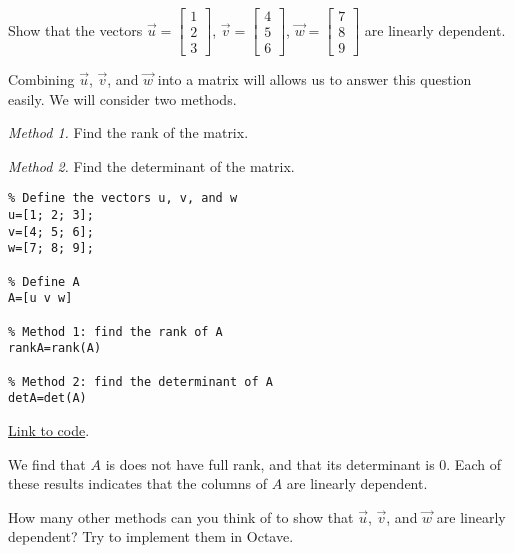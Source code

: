 \documentclass{ximera}
\begin{document}
\begin{example}
    Show that the vectors $\vec{u}=\begin{bmatrix}1\\2\\3\end{bmatrix}$, $\vec{v}=\begin{bmatrix}4\\5\\6\end{bmatrix}$, $\vec{w}=\begin{bmatrix}7\\8\\9\end{bmatrix}$ are linearly dependent.
    \begin{explanation}
        Combining $\vec{u}$, $\vec{v}$, and $\vec{w}$ into a matrix will allows us to answer this question easily.  We will consider two methods.

        \emph{Method 1.} Find the rank of the matrix.
        
        \emph{Method 2.} Find the determinant of the matrix.
        \begin{verbatim}
% Define the vectors u, v, and w
u=[1; 2; 3];
v=[4; 5; 6];
w=[7; 8; 9];

% Define A
A=[u v w]

% Method 1: find the rank of A
rankA=rank(A)

% Method 2: find the determinant of A
detA=det(A)
        \end{verbatim}
        
\href{https://sagecell.sagemath.org/?z=eJxVjTsKwzAQRHuB7jCNIQE3dv5ZVAjS5gTChYnW2JhI4Mjy9SPlA0kz7OzOmy1w4W5wjNAzIt-Cnx6YS8QSrbNYpJiVqQg1YdOQFFGZLWFH2Ge3KHMgHAmn7KQovm1aCq3MjIileR-uHHpvUZ2RAvb1bmrdCN_lcB61yrrS6z-g_gEsB57ug2td-HBpo1WSRD0Bo444Hw==&lang=octave&interacts=eJyLjgUAARUAuQ==}{Link to code}.  

We find that $A$ is does not have full rank, and that its determinant is $0$.  Each of these results indicates that the columns of $A$ are linearly dependent.
\end{explanation}

How many other methods can you think of to show that $\vec{u}$, $\vec{v}$, and $\vec{w}$ are linearly dependent?  Try to implement them in Octave.
\end{example}
\end{document}
